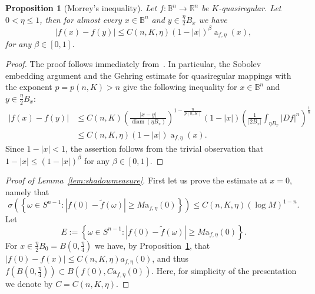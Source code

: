 \documentclass[11pt,a4paper,reqno]{amsart}
\newtheorem{prop}[theorem]{Proposition}
\theoremstyle{definition}
\renewcommand{\a}{\operatorname{a}}
\newcommand{\om}{\omega}
\newcommand{\B}{\mathbb{B}^n}
\newcommand{\R}{\mathbb{R}}
\newcommand{\diam}{\operatorname{diam}}
\numberwithin{komcounter}{section}
\begin{document}
\begin{appendix}
\begin{prop}[Morrey's inequality]\label{lem:Morrey}
Let $f:\B\rightarrow\R^n$ be $K$-quasiregular. Let $0<\eta\leq 1$, then for almost every $x\in \B$ and $y\in \frac{\eta}{2}B_x$ we have
$$
|f(x)-f(y)|\leq C(n,K,\eta) (1-|x|)^\beta \a_{f,\eta}(x),
$$
for any $\beta\in [0,1]$.	
\end{prop}
\begin{proof}
 The proof follows immediately from~\cite[Theorem 5.2]{bi}. In particular, the Sobolev embedding argument and the Gehring estimate for quasiregular mappings with the exponent $p=p(n,K)>n$ give the following inequality for $x\in \B$ and $y\in\frac{\eta}{2}B_x$:
 \begin{align*}
  |f(x)-f(y)|&\leq C(n,K) \left(\frac{|x-y|}{\diam (\eta B_x)}\right)^{1-\frac{n}{p(n,K)}}(1-|x|)\left(\frac{1}{|2B_x|}\int_{\eta B_x} |Df|^n\right)^{\frac1n} \\
  &\leq C(n,K,\eta) (1-|x|) \a_{f,\eta}(x).
 \end{align*}
 Since $1-|x|<1$, the assertion follows from the trivial observation that $1-|x|\leq (1-|x|)^\beta$ for any $\beta\in[0,1]$.
\end{proof}

\begin{proof}[Proof of Lemma~\ref{lem:shadowmeasure}]
First let us prove the estimate at $x=0$, namely that
\begin{equation}\label{lem:assert-zero}
 \sigma\left(\left\{ \om\in S^{n-1}:|f(0)-\tilde{f}(\om)|\geq M\mathrm a_{f,\eta} (0)\right\}\right)\leq C(n,K,\eta) (\log M)^{1-n}.\end{equation}
 Let 
 $$
 E:=\left\{ \om\in S^{n-1}:|f(0)-\tilde{f}(\om)|\geq M\mathrm a_{f,\eta} (0)\right\}.
 $$
 For $x\in \frac{\eta}{2} B_0=B(0,\frac{\eta}{4})$ we have, by Proposition~\ref{lem:Morrey}, that $|f(0)-f(x)|\leq C(n,K,\eta) a_{f,\eta}(0)$, and thus $f(B(0,\frac{\eta}{4}))\subset B(f(0),C\mathrm a_{f,\eta}(0))$. Here, for simplicity of the presentation we denote by $C=C(n, K, \eta)$.
		

\end{proof}
\end{appendix}
\end{document}

